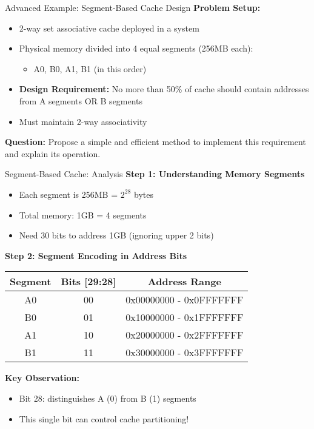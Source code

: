 \documentclass[aspectratio=169,12pt]{beamer}
\begin{document}
\begin{frame}{Advanced Example: Segment-Based Cache Design}
\textbf{Problem Setup:}
\begin{itemize}
    \item 2-way set associative cache deployed in a system
    \item Physical memory divided into 4 equal segments (256MB each):
    \begin{itemize}
        \item A0, B0, A1, B1 (in this order)
    \end{itemize}
    \item \textbf{Design Requirement:} No more than 50\% of cache should contain addresses from A segments OR B segments
    \item Must maintain 2-way associativity
\end{itemize}

\textbf{Question:} Propose a simple and efficient method to implement this requirement and explain its operation.
\end{frame}

\begin{frame}{Segment-Based Cache: Analysis}
\textbf{Step 1: Understanding Memory Segments}
\begin{itemize}
    \item Each segment is 256MB = $2^{28}$ bytes
    \item Total memory: 1GB = 4 segments
    \item Need 30 bits to address 1GB (ignoring upper 2 bits)
\end{itemize}
\pause

\textbf{Step 2: Segment Encoding in Address Bits}
\begin{center}
\begin{tabular}{|c|c|c|}
\hline
\textbf{Segment} & \textbf{Bits [29:28]} & \textbf{Address Range} \\
\hline
A0 & 00 & 0x00000000 - 0x0FFFFFFF \\
B0 & 01 & 0x10000000 - 0x1FFFFFFF \\
A1 & 10 & 0x20000000 - 0x2FFFFFFF \\
B1 & 11 & 0x30000000 - 0x3FFFFFFF \\
\hline
\end{tabular}
\end{center}
\pause

\textbf{Key Observation:}
\begin{itemize}
    \item Bit 28: distinguishes A (0) from B (1) segments
    \item This single bit can control cache partitioning!
\end{itemize}
\end{frame}
\end{document}
